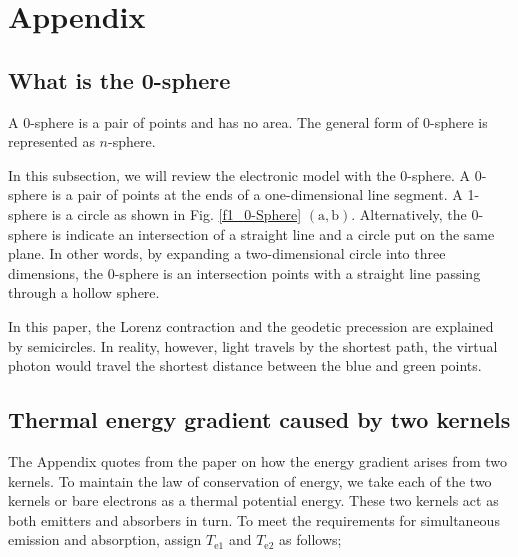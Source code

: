 \documentclass[%
 reprint,
 amsmath,amssymb,
 aps,
]{revtex4-1}
\numberwithin{equation}{section}%
\begin{document}
\clearpage

\section{Appendix}
\label{sec:Appendix}

\subsection{What is the 0-sphere}
\label{sec:WhatIsThe0Sphere}

    A 0-sphere is a pair of points and has no area. The general form of 0-sphere is represented as $n$-sphere.

    In this subsection, we will review the electronic model with the 0-sphere. A 0-sphere is a pair of points at the ends of a one-dimensional line segment. A 1-sphere is a circle as shown in Fig. \ref{f1_0-Sphere} $(\bm{\mathrm{a}}, \bm{\mathrm{b}})$. Alternatively, the 0-sphere is indicate an intersection of a straight line and a circle put on the same plane. In other words, by expanding a two-dimensional circle into three dimensions, the 0-sphere is an intersection points with a straight line passing through a hollow sphere.

    In this paper, the Lorenz contraction and the geodetic precession are explained by semicircles. In reality, however, light travels by the shortest path, the virtual photon would travel the shortest distance between the blue and green points.


\subsection{Thermal energy gradient caused by two kernels}
\label{sec:ThermalEnergyGradient}

    The Appendix quotes from the paper \cite{Hanamura2023} on how the energy gradient arises from two kernels. To maintain the law of conservation of energy, we take each of the two kernels or bare electrons as a thermal potential energy. These two kernels act as both emitters and absorbers in turn. To meet the requirements for simultaneous emission and absorption, assign $T_{\mathrm{e1}}$ and $T_{\mathrm{e2}}$ as follows; 
\end{document}
